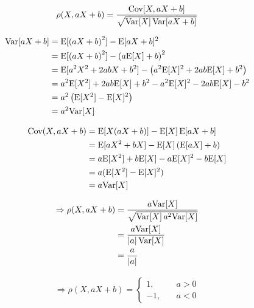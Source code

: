 \[ \rho(X, aX+b) = \frac{\mathrm{Cov}[X,aX+b]}{\sqrt{\mathrm{Var}[X] \, \mathrm{Var}[aX+b]}} \]

\begin{align*}
\mathrm{Var}[aX+b] &= \mathrm{E}[\left(aX+b\right)^2] - \mathrm{E}[aX+b]^2 \\
           &= \mathrm{E}[\left(aX+b\right)^2] - \left(a \mathrm{E}[X] + b\right)^2 \\
           &= \mathrm{E}[a^2 X^2 + 2abX + b^2] - \left(a^2 \mathrm{E}[X]^2 + 2ab \mathrm{E}[X] + b^2\right) \\
	   &= a^2 \mathrm{E}[X^2] + 2ab \mathrm{E}[X] + b^2 - a^2 \mathrm{E}[X]^2 - 2ab \mathrm{E}[X] - b^2 \\
	   &= a^2 \left(\mathrm{E}[X^2] - \mathrm{E}[X]^2\right) \\
	   &= a^2 \mathrm{Var}[X]
\end{align*}

\begin{align*}
\mathrm{Cov}(X, aX+b) &= \mathrm{E}[X (aX+b)] - \mathrm{E}[X] \, \mathrm{E}[aX+b] \\
	      &= \mathrm{E}[aX^2+bX] - \mathrm{E}[X] \, (\mathrm{E}[aX]+b) \\
	      &= a \mathrm{E}[X^2] + b \mathrm{E}[X] - a \mathrm{E}[X]^2 - b \mathrm{E}[X] \\
	      &= a (\mathrm{E}[X^2] - \mathrm{E}[X]^2) \\
	      &= a \mathrm{Var}[X]
\end{align*}

\begin{align*}
\Rightarrow \rho(X, aX+b) &= \frac{a \mathrm{Var}[X]}{\sqrt{\mathrm{Var}[X] \, a^2 \mathrm{Var}[X]}} \\
			  &= \frac{a \mathrm{Var}[X]}{|a| \, \mathrm{Var}[X]} \\
			  &= \frac{a}{|a|}
\end{align*}

\begin{align*}
\Rightarrow \rho(X, aX+b) = \begin{cases}
	1, \quad & a > 0 \\
	-1, \quad & a < 0
\end{cases}
\end{align*}

